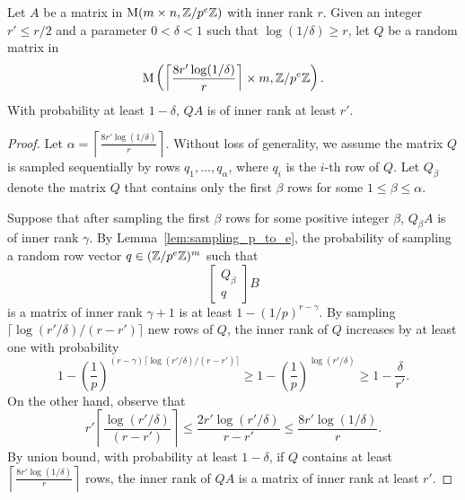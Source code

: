 \begin{lemma}\label{lem:individualization_single_matrix}
Let $A$ be a matrix in $\mathrm{M}(m\times n,  \mathbb{Z} / p^e \mathbb{Z})$ with inner rank $r$. 
Given an integer $r' \leq r / 2$ and a parameter $0 < \delta < 1$ such that $\log(1 / \delta) \geq r$, 
let $Q$ be a random matrix in \[\mathrm{M}\left(\left\lceil \frac{8 r' \log (1/\delta)}{r}\right\rceil\times m,  \mathbb{Z} / p^e \mathbb{Z}\right).\] With probability at least $1 - \delta$, $QA$ is of inner rank at least $r'$. 

\end{lemma}
\begin{proof}

Let $\alpha = \left\lceil \frac{8 r' \log (1/\delta)}{r}\right \rceil$. 
Without loss of generality,
we assume the matrix $Q$ is sampled sequentially by rows $q_1, . . . , q_\alpha$, where $q_i$ is the $i$-th row of $Q$.
Let $Q_\beta$ denote the matrix $Q$ that contains only the first $\beta$ rows for some $1 \leq \beta \leq \alpha$. 

Suppose that after sampling the first $\beta$ rows for some positive integer $\beta$, $Q_\beta A$ is of inner rank $\gamma$. 
By Lemma~\ref{lem:sampling_p_to_e}, the probability of sampling a random row vector $q \in (\mathbb{Z} / p^e \mathbb{Z})^m$ such that \[\begin{bmatrix}Q_\beta \\ q\end{bmatrix}B\] is a matrix of inner rank $\gamma + 1$ is at least $1 - (1 / p)^{r - \gamma}$.
By sampling $\lceil \log (r' / \delta)  / (r - r')\rceil $ new rows of $Q$, the inner rank of $Q$ increases by at
least one with probability
\[1 - \left(\frac{1}{p} \right)^{(r - \gamma) \lceil \log(r' / \delta) / (r - r')\rceil} \geq 1 - \left(\frac{1}{p} \right)^{\log (r' / \delta)}\geq 1 - \frac{\delta}{r'}. \]
On the other hand, observe that 
\[r' \left\lceil \frac{\log (r' / \delta)}{(r - r')}\right\rceil \leq \frac{2 r' \log (r' / \delta)}{r - r'}\leq \frac{8r' \log (1 / \delta)}{r}. \]
By union bound, with probability at least $1 - \delta$, if $Q$ contains at least $\left\lceil \frac{8 r' \log (1/\delta)}{r}\right\rceil$ rows, the inner rank of $QA$ is a matrix of inner rank at least $r'$. 
\end{proof}


